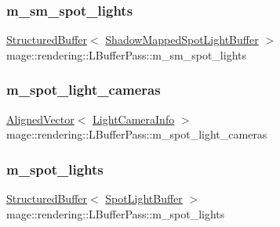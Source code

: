 \subsubsection{\texorpdfstring{m\+\_\+sm\+\_\+spot\+\_\+lights}{m\_sm\_spot\_lights}}
{\footnotesize\ttfamily \mbox{\hyperlink{classmage_1_1rendering_1_1_structured_buffer}{Structured\+Buffer}}$<$ \mbox{\hyperlink{structmage_1_1rendering_1_1_shadow_mapped_spot_light_buffer}{Shadow\+Mapped\+Spot\+Light\+Buffer}} $>$ mage\+::rendering\+::\+L\+Buffer\+Pass\+::m\+\_\+sm\+\_\+spot\+\_\+lights\hspace{0.3cm}{\ttfamily [private]}}

\mbox{\label{classmage_1_1rendering_1_1_l_buffer_pass_aa888c81683fc9be4cdfab1a49d03eac3}} 
\subsubsection{\texorpdfstring{m\+\_\+spot\+\_\+light\+\_\+cameras}{m\_spot\_light\_cameras}}
{\footnotesize\ttfamily \mbox{\hyperlink{namespacemage_a8664bfb5ce2179fc64eae9f82c8a5ba8}{Aligned\+Vector}}$<$ \mbox{\hyperlink{structmage_1_1rendering_1_1_l_buffer_pass_1_1_light_camera_info}{Light\+Camera\+Info}} $>$ mage\+::rendering\+::\+L\+Buffer\+Pass\+::m\+\_\+spot\+\_\+light\+\_\+cameras\hspace{0.3cm}{\ttfamily [private]}}

\mbox{\label{classmage_1_1rendering_1_1_l_buffer_pass_abc2a2704d99a2a5335d28f3039d600ca}} 
\subsubsection{\texorpdfstring{m\+\_\+spot\+\_\+lights}{m\_spot\_lights}}
{\footnotesize\ttfamily \mbox{\hyperlink{classmage_1_1rendering_1_1_structured_buffer}{Structured\+Buffer}}$<$ \mbox{\hyperlink{structmage_1_1rendering_1_1_spot_light_buffer}{Spot\+Light\+Buffer}} $>$ mage\+::rendering\+::\+L\+Buffer\+Pass\+::m\+\_\+spot\+\_\+lights\hspace{0.3cm}{\ttfamily [private]}}

